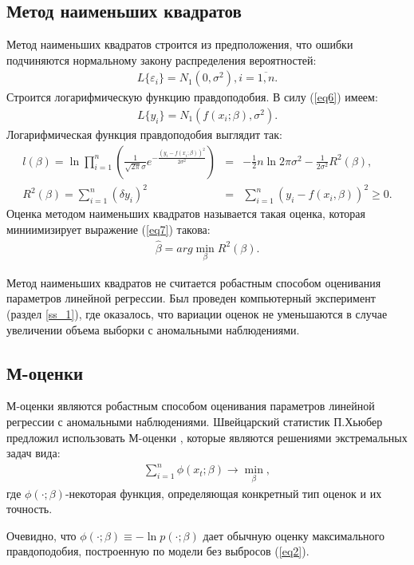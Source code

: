 \subsection{Метод наименьших квадратов}
Метод наименьших квадратов строится из предположения, что ошибки подчиняются нормальному закону распределения вероятностей:
\begin{eqnarray}
    \label{eq5}L\{\varepsilon_i\}=N_1(0,\sigma^2), i = \overline{1,n}.
\end{eqnarray}
Строится логарифмическую функцию правдоподобия. В силу (\ref{eq6}) имеем:
\begin{eqnarray}
    L\{y_i\}=N_1(f(x_i;\beta), \sigma^2).
\end{eqnarray}
Логарифмическая функция правдоподобия выглядит так\cite{Kharin}:
\begin{eqnarray}
    l(\beta)=\ln \prod_{i=1}^{n}(\frac{1}{\sqrt{2\pi}\sigma}e^{-\frac{(y_i-f(x_i;\beta))^2}{2\sigma^2}})&=&-\frac{1}{2}n\ln{2\pi\sigma^2}-\frac{1}{2\sigma^2}R^2(\beta),\\
    \label{eq7}R^2(\beta)=\sum_{i=1}^{n}(\delta y_i)^2&=&\sum_{i=1}^{n}(y_i-f(x_i,\beta))^2\geq 0.
\end{eqnarray}
Оценка методом наименьших квадратов называется такая оценка, которая миниимизирует  выражение (\ref{eq7}) такова:
\begin{eqnarray}
    \hat{\beta}=arg \min_{\beta}R^2(\beta).
\end{eqnarray}

Метод наименьших квадратов не считается робастным способом оценивания параметров линейной регрессии. Был проведен компьютерный эксперимент (раздел \ref{ss_1}), где оказалось, что вариации оценок не уменьшаются в случае увеличении объема выборки с аномальными наблюдениями.

\subsection{М-оценки}
М-оценки являются робастным способом оценивания параметров линейной регрессии с аномальными наблюдениями.
Швейцарский статистик П.Хьюбер предложил использовать М-оценки \cite{Kharin}, которые являются решениями экстремальных задач вида:
\begin{eqnarray}
    \sum_{i=1}^{n}\phi(x_t;\beta)\rightarrow \min_{\beta},
\end{eqnarray}
где $\phi(\cdot;\beta)$-некоторая функция, определяющая конкретный тип оценок и их точность.

Очевидно, что $\phi(\cdot;\beta)\equiv - \ln{p(\cdot;\beta)}$ дает обычную оценку максимального правдоподобия, построенную по модели без выбросов (\ref{eq2}).

